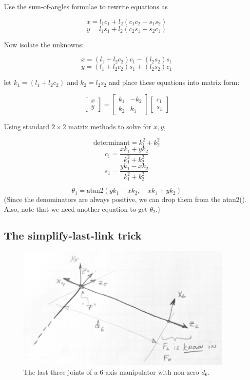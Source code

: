 Use the sum-of-angles formulae to rewrite equations as

\[
x = l_1c_1 + l_2(c_1c_2 -s_1s_2)
\]
\[
y = l_1s_1 + l_2(c_2s_1 + s_2c_1)
\]

Now isolate the unknowns:

\[
x = (l_1+l_2c_2)c_1 - (l_2s_2)s_1
\]
\[
y = (l_1+l_2c_2)s_1 + (l_2s_2)c_1
\]


let $k_1 = (l_1+l_2c_2)$ and $k_2 = l_2s_2$ and place these equations into matrix form:

\[
\begin{bmatrix} x \\ y \end{bmatrix} =
\begin{bmatrix} k_1  & -k_2 \\ k_2 & k_1 \end{bmatrix}
\begin{bmatrix} c_1 \\ s_1   \end{bmatrix}
\]

Using standard $2\times2$ matrix methods to solve for $x,y$,

\[
\mathrm{determinant} = k_1^2 +k_2^2
\]
\[
c_1 = \frac {xk_1+yk_2}  {k_1^2 +k_2^2}
\]
\[
s_1 = \frac {yk_1-xk_2}  {k_1^2 +k_2^2}
\]

\[
\theta_1 = \mathrm{atan2}(yk_1-xk_2, \quad xk_1+yk_2)
\]
(Since the denominators are always positive, we can drop them from the atan2(). Also, note that
we need another equation to get $\theta_2$.)




\subsection{The simplify-last-link trick}

\begin{figure}\centering
    \includegraphics[width=4.25in]{figs04/01174.png}
    \caption{The last three joints of a 6 axis manipulator with non-zero $d_6$.}\label{lastframetrickfig}
\end{figure}

